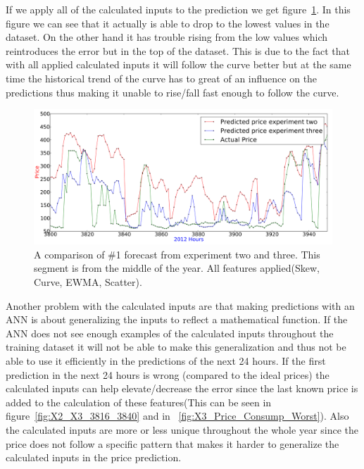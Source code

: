 If we apply all of the calculated inputs to the prediction we get figure~\ref{fig:X2_X3_AllParameters_3800_4000}. In this figure we can see that it actually is able to drop to the lowest values in the dataset. On the other hand it has trouble rising from the low values which reintroduces the error but in the top of the dataset. This is due to the fact that with all applied calculated inputs it will follow the curve better but at the same time the historical trend of the curve has to great of an influence on the predictions thus making it unable to rise/fall fast enough to follow the curve.

\begin{figure}[H]
\centering
\includegraphics[width=\linewidth]{billeder/PriceExperimentalAnalysis/X2_X3_AllFeatures_3800_4000.png}
\caption{A comparison of \#1 forecast from experiment two and three. This segment is from the middle of the year. All features applied(Skew, Curve, EWMA, Scatter).}
\label{fig:X2_X3_AllParameters_3800_4000}
\end{figure}

Another problem with the calculated inputs are that making predictions with an ANN is about generalizing the inputs to reflect a mathematical function. If the ANN does not see enough examples of the calculated inputs throughout the training dataset it will not be able to make this generalization and thus not be able to use it efficiently in the predictions of the next 24 hours. If the first prediction in the next 24 hours is wrong (compared to the ideal prices) the calculated inputs can help elevate/decrease the error since the last known price is added to the calculation of these features(This can be seen in figure~\ref{fig:X2_X3_3816_3840} and in ~\ref{fig:X3_Price_Consump_Worst}). Also the calculated inputs are more or less unique throughout the whole year since the price does not follow a specific pattern that makes it harder to generalize the calculated inputs in the price prediction. 

